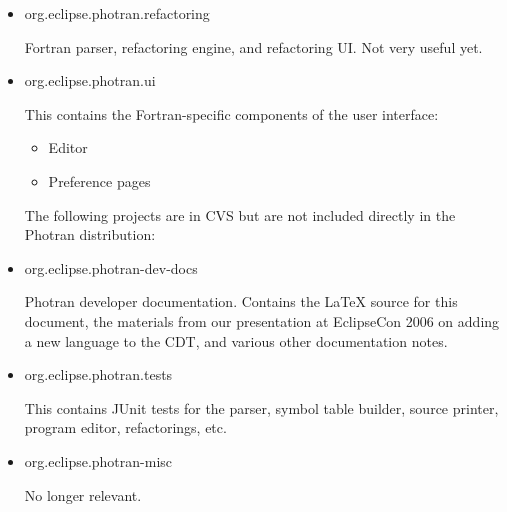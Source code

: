 \begin{itemize}
\item org.eclipse.photran.refactoring

	Fortran parser, refactoring engine, and refactoring UI.  Not very useful yet.

\item org.eclipse.photran.ui

	This contains the Fortran-specific components of the user interface:
	\begin{itemize}
	\item Editor
	\item Preference pages
	\end{itemize}

\noindent The following projects are in CVS but are not included directly in the
Photran distribution:

\item org.eclipse.photran-dev-docs

	Photran developer documentation.
	Contains the LaTeX source for this document, the materials from our
	presentation at EclipseCon 2006 on adding a new language to the CDT,
	and various other documentation notes.

\item org.eclipse.photran.tests

	This contains JUnit tests for the parser, symbol table builder,
	source printer, program editor, refactorings, etc.

\item org.eclipse.photran-misc

	No longer relevant.

\end{itemize}
